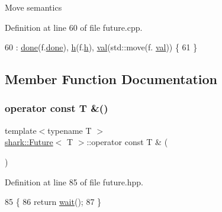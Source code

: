 Move semantics 

Definition at line 60 of file future.\+cpp.


\begin{DoxyCode}
60                               : \hyperlink{structshark_1_1_future_ae873cf93e919c066f04ff337ce3a21e1}{done}(f.\hyperlink{structshark_1_1_future_ae873cf93e919c066f04ff337ce3a21e1}{done}), \hyperlink{structshark_1_1_future_a54f00db085adbffb18b2e2ab9e3d4b32}{h}(f.\hyperlink{structshark_1_1_future_a54f00db085adbffb18b2e2ab9e3d4b32}{h}), \hyperlink{structshark_1_1_future_ad47e70b84ce6303568af0bd6aca991da}{val}(std::move(f.
      \hyperlink{structshark_1_1_future_ad47e70b84ce6303568af0bd6aca991da}{val})) \{
61 \}
\end{DoxyCode}


\subsection{Member Function Documentation}
\hypertarget{structshark_1_1_future_a2ad40708ac7a1df9e288af5739d513f1}{}\label{structshark_1_1_future_a2ad40708ac7a1df9e288af5739d513f1} 
\subsubsection{\texorpdfstring{operator const T \&()}{operator const T \&()}}
{\footnotesize\ttfamily template$<$typename T $>$ \\
\hyperlink{structshark_1_1_future}{shark\+::\+Future}$<$ T $>$\+::operator const T \& (\begin{DoxyParamCaption}{ }\end{DoxyParamCaption})\hspace{0.3cm}{\ttfamily [inline]}}



Definition at line 85 of file future.\+hpp.


\begin{DoxyCode}
85                                         \{
86         \textcolor{keywordflow}{return} \hyperlink{structshark_1_1_future_a88a411b5cedec34af07b054d15deedc2}{wait}();
87     \}
\end{DoxyCode}
\hypertarget{structshark_1_1_future_a45d4c1fdd9602d41f7e07f49b31e5943}{}\label{structshark_1_1_future_a45d4c1fdd9602d41f7e07f49b31e5943} 
